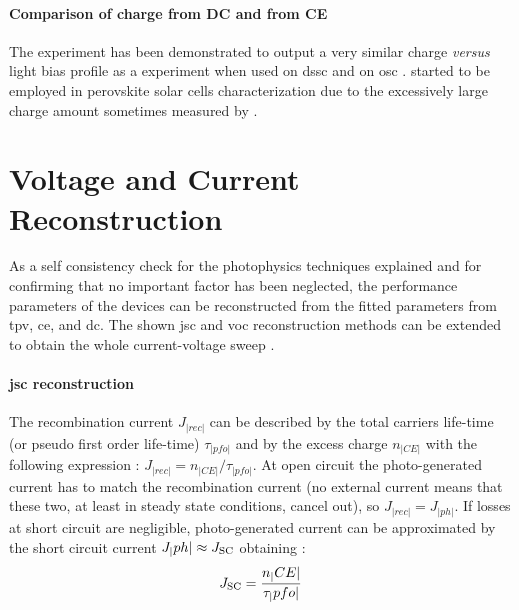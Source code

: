 	\paragraph{Comparison of charge from DC and from CE}
	The  experiment has been demonstrated to output a very similar charge \textit{versus} light bias profile as a  experiment when used on \gls{dssc} \cite{ORegan2005,Barnes2013} and on \gls{osc} \cite{Shuttle2008a}.
	 started to be employed in perovskite solar cells characterization due to the excessively large charge amount sometimes measured by  \cite{Wheeler2017,ORegan2015b}.

\section{Voltage and Current Reconstruction}
As a self consistency check for the photophysics techniques explained and for confirming that no important factor has been neglected, the performance parameters of the devices can be reconstructed from the fitted parameters from \gls{tpv}, \gls{ce}, and \gls{dc}.
The shown \gls{jsc} and \gls{voc} reconstruction methods can be extended to obtain the whole current-voltage sweep \cite{Maurano2011}.

\paragraph{\Gls{jsc} reconstruction}
The recombination current $J_|rec|$ can be described by the total carriers life-time (or pseudo first order life-time) $\tau_|pfo|$ and by the excess charge $n_|CE|$ with the following expression \cite{Wheeler2017,Du2018}: $J_|rec| = n_|CE| / \tau_|pfo|$.
At open circuit the photo-generated current has to match the recombination current (no external current means that these two, at least in steady state conditions, cancel out), so $J_|rec| = J_|ph|$.
If losses at short circuit are negligible, photo-generated current can be approximated by the short circuit current $J_|ph| \approx J_\mathrm{SC}$ obtaining \cite{ORegan2015b}:
\begin{equation}\label{eq:reconstruction_jsc}
J_\mathrm{SC} = \frac{n_|CE|}{\tau_|pfo|}
\end{equation}

